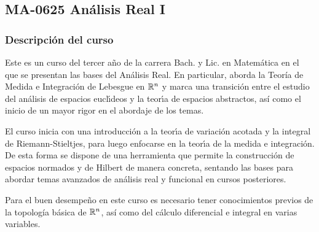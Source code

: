 \newpage
\subsection*{MA-0625 Análisis Real I}

\begin{refsection}
\begin{table}[H]
\end{table}



\subsubsection*{Descripción del curso}

Este es un curso del tercer año de la carrera Bach. y Lic. en Matemática en el que se presentan las bases del Análisis Real. En particular, aborda la Teoría de Medida e Integración de Lebesgue en $\mathbb{R}^n$ y marca una transici\'{o}n entre el estudio del an\'{a}lisis de espacios eucl\'{\i}deos y la teor\'{\i}a de espacios abstractos, así como el inicio de un mayor rigor en el abordaje de los temas. 

El curso inicia con una introducci\'{o}n a la teor\'{\i}a de variación acotada y la integral de Riemann-Stieltjes, para luego enfocarse en la teor\'{\i}a de la medida e integraci\'{o}n. De esta forma se
dispone de una herramienta que permite la construcci\'{o}n de espacios normados y de Hilbert de manera concreta, sentando las bases para abordar temas avanzados de an\'{a}lisis real y funcional en cursos posteriores.

Para el buen desempeño en este curso es necesario tener conocimientos previos de la topología básica de $\mathbb{R}^n$, así como del cálculo diferencial e integral en varias variables.




\end{refsection}
